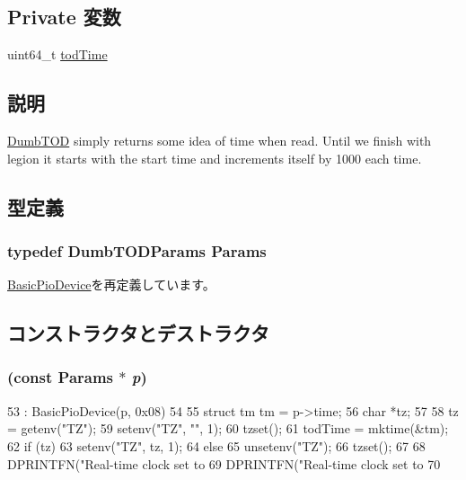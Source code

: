 \subsection*{Private 変数}
\begin{DoxyCompactItemize}
\item 
uint64\_\-t \hyperlink{classDumbTOD_a7823975262c83092e897cd60ec42b072}{todTime}
\end{DoxyCompactItemize}


\subsection{説明}
\hyperlink{classDumbTOD}{DumbTOD} simply returns some idea of time when read. Until we finish with legion it starts with the start time and increments itself by 1000 each time. 

\subsection{型定義}
\hypertarget{classDumbTOD_ac75d9dee405db8ba88e1f9823b893008}{
\subsubsection[{Params}]{\setlength{\rightskip}{0pt plus 5cm}typedef DumbTODParams {\bf Params}}}
\label{classDumbTOD_ac75d9dee405db8ba88e1f9823b893008}


\hyperlink{classBasicPioDevice_a2845515ac6467f10540747053c8a0449}{BasicPioDevice}を再定義しています。

\subsection{コンストラクタとデストラクタ}
\hypertarget{classDumbTOD_a67e4f4f0072b0ebbe55ff909d378e11b}{
\subsubsection[{DumbTOD}]{ (const {\bf Params} $\ast$ {\em p})}}
\label{classDumbTOD_a67e4f4f0072b0ebbe55ff909d378e11b}



\begin{DoxyCode}
53     : BasicPioDevice(p, 0x08)
54 {
55     struct tm tm = p->time;
56     char *tz;
57 
58     tz = getenv("TZ");
59     setenv("TZ", "", 1);
60     tzset();
61     todTime = mktime(&tm);
62     if (tz)
63         setenv("TZ", tz, 1);
64     else
65         unsetenv("TZ");
66     tzset();
67 
68     DPRINTFN("Real-time clock set to %
69     DPRINTFN("Real-time clock set to %
70 }
\end{DoxyCode}



